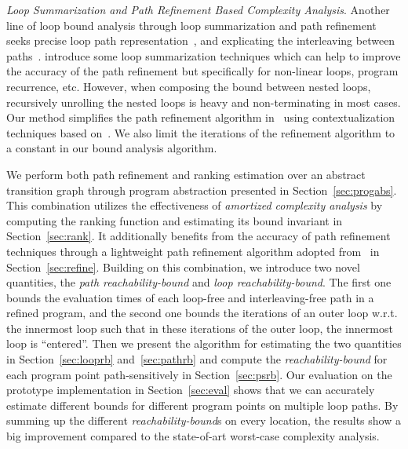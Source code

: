 \emph{Loop Summarization and Path Refinement Based Complexity Analysis}.
Another line of loop bound analysis through loop summarization and path refinement seeks precise loop path representation~\cite{ManoliosV06,BalakrishnanSIG09,SharmaDDA11,Flores-MontoyaH14,HumenbergerJK18,CyphertBKR19}, and explicating the interleaving between paths~\cite{GulwaniJK09,ZulegerGSV11}.
\cite{KincaidBCR19,KincaidCBR18,BreckCKR20} introduce some loop summarization techniques which can help to improve the accuracy of the path refinement but specifically for non-linear loops, program recurrence, etc.
However, when composing the bound between nested loops, recursively unrolling the nested loops is heavy and non-terminating in most cases.
%
Our method simplifies the path refinement algorithm in~\cite{GulwaniJK09} using contextualization techniques based on~\cite{ZulegerGSV11,SinnZV14,ManoliosV06}.
We also limit the iterations of the refinement algorithm to a constant in our bound analysis algorithm.
%

We perform both path refinement and ranking estimation over an abstract transition graph through program abstraction presented in Section~\ref{sec:progabs}.
This combination utilizes the effectiveness of \emph{amortized complexity analysis} by computing the ranking function
and estimating its bound invariant in Section~\ref{sec:rank}.
It additionally benefits from the accuracy of path refinement techniques through a lightweight path refinement algorithm adopted from~\cite{GulwaniJK09} in Section~\ref{sec:refine}.
Building on this combination, we introduce two novel quantities,
the \emph{path reachability-bound} and \emph{loop reachability-bound}.
The first one bounds the evaluation times of each loop-free and interleaving-free path in a refined program, and the second one bounds the iterations of an outer loop w.r.t. the innermost loop such that in these iterations of the outer loop, the innermost loop is ``entered''. 
Then we present the algorithm for estimating the two quantities in Section~\ref{sec:looprb} and~\ref{sec:pathrb} and compute the \emph{reachability-bound} for each program point path-sensitively in Section~\ref{sec:psrb}.
Our evaluation on the prototype implementation in Section~\ref{sec:eval} shows that we can accurately estimate different bounds for different program points on multiple loop paths. By summing up the different \emph{reachability-bound}s on every location, the results show a big improvement compared to the state-of-art worst-case complexity analysis.


